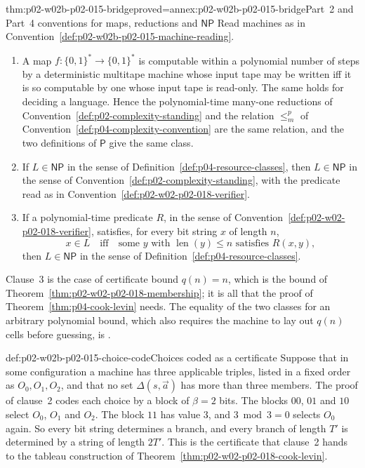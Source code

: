 \begin{hblemma}{thm:p02-w02b-p02-015-bridge}{proved=annex:p02-w02b-p02-015-bridge}{Part~2 and Part~4 conventions for maps, reductions and \(\mathsf{NP}\)}
Read machines as in Convention~\ref{def:p02-w02b-p02-015-machine-reading}.
\begin{enumerate}
  \item A map \(f:\{0,1\}^*\to\{0,1\}^*\) is computable within a polynomial
        number of steps by a deterministic multitape machine whose input tape
        may be written iff it is so computable by one whose input tape is
        read-only.  The same holds for deciding a language.  Hence the
        polynomial-time many-one reductions of
        Convention~\ref{def:p02-complexity-standing} and the relation
        \(\leq_m^p\) of Convention~\ref{def:p04-complexity-convention} are the
        same relation, and the two definitions of \(\mathsf P\) give the same
        class.
  \item If \(L\in\mathsf{NP}\) in the sense of
        Definition~\ref{def:p04-resource-classes}, then \(L\in\mathsf{NP}\)
        in the sense of Convention~\ref{def:p02-complexity-standing}, with
        the predicate read as in
        Convention~\ref{def:p02-w02-p02-018-verifier}.
  \item If a polynomial-time predicate \(R\), in the sense of
        Convention~\ref{def:p02-w02-p02-018-verifier}, satisfies, for every
        bit string \(x\) of length \(n\),
        \[
         x\in L\quad\text{iff}\quad\text{some }y\text{ with }
         \operatorname{len}(y)\leq n\text{ satisfies }R(x,y),
        \]
        then \(L\in\mathsf{NP}\) in the sense of
        Definition~\ref{def:p04-resource-classes}.
\end{enumerate}
\end{hblemma}

Clause~3 is the case of certificate bound \(q(n)=n\), which is the bound of
Theorem~\ref{thm:p02-w02-p02-018-membership}; it is all that the proof of
Theorem~\ref{thm:p04-cook-levin} needs.  The equality of the two classes for
an arbitrary polynomial bound, which also requires the machine to lay out
\(q(n)\) cells before guessing, is \cite[thm.~2.6]{AroraBarak2009}.

\begin{hbexample}{def:p02-w02b-p02-015-choice-code}{Choices coded as a certificate}
Suppose that in some configuration a machine has three applicable triples,
listed in a fixed order as \(O_0,O_1,O_2\), and that no set
\(\Delta(s,\vec a)\) has more than three members.  The proof of clause~2
codes each choice by a block of \(\beta=2\) bits.  The blocks \(00\), \(01\)
and \(10\) select \(O_0\), \(O_1\) and \(O_2\).  The block \(11\) has value
\(3\), and \(3\bmod 3=0\) selects \(O_0\) again.  So every bit string
determines a branch, and every branch of length \(T'\) is determined by a
string of length \(2T'\).  This is the certificate that clause~2 hands to the
tableau construction of Theorem~\ref{thm:p02-w02-p02-018-cook-levin}.
\end{hbexample}

